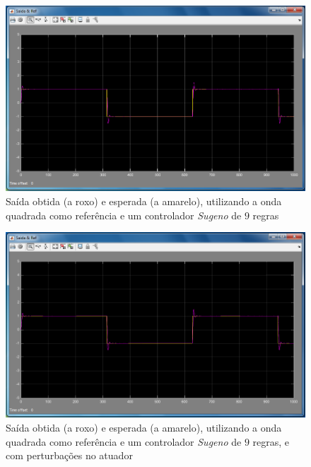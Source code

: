 \documentclass{article}
\begin{document}

\begin{figure}[h]
  \centering
      \includegraphics[scale=0.3]{Images/Sugeno_9_square.png}
  \caption{Saída obtida (a roxo) e esperada (a amarelo), utilizando a onda quadrada como referência e um controlador \emph{Sugeno} de $9$ regras}
\end{figure}

\begin{figure}[h]
  \centering
      \includegraphics[scale=0.3]{Images/Sugeno_9_square_actuator.png}
  \caption{Saída obtida (a roxo) e esperada (a amarelo), utilizando a onda quadrada como referência e um controlador \emph{Sugeno} de $9$ regras, e com perturbações no atuador}
\end{figure}

\clearpage
\end{document}
